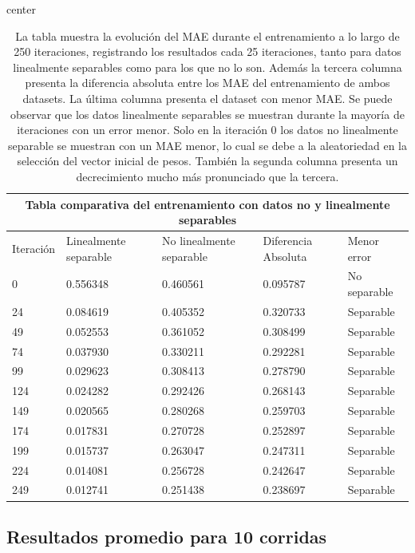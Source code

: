 \documentclass[12pt]{article}
\begin{document}
\begin{table}[H]
    \centering
    \begin{adjustbox}{center}
    \begin{tabular}{lllll}
    \multicolumn{5}{c}{Tabla comparativa del entrenamiento con datos no y linealmente separables} \\
    \toprule
     Iteración & Linealmente separable & No linealmente separable & Diferencia Absoluta & Menor error \\
    \midrule
    0 & 0.556348 & 0.460561 & 0.095787 & No separable \\
    24 & 0.084619 & 0.405352 & 0.320733 & Separable \\
    49 & 0.052553 & 0.361052 & 0.308499 & Separable \\
    74 & 0.037930 & 0.330211 & 0.292281 & Separable \\
    99 & 0.029623 & 0.308413 & 0.278790 & Separable \\
    124 & 0.024282 & 0.292426 & 0.268143 & Separable \\
    149 & 0.020565 & 0.280268 & 0.259703 & Separable \\
    174 & 0.017831 & 0.270728 & 0.252897 & Separable \\
    199 & 0.015737 & 0.263047 & 0.247311 & Separable \\
    224 & 0.014081 & 0.256728 & 0.242647 & Separable \\
    249 & 0.012741 & 0.251438 & 0.238697 & Separable \\
    \bottomrule
    \end{tabular}
    \end{adjustbox}
    \caption{La tabla muestra la evolución del MAE durante el entrenamiento a lo largo de 250 iteraciones, registrando los resultados cada 25 iteraciones, tanto para datos linealmente separables como para los que no lo son. Además la tercera columna presenta la diferencia absoluta entre los MAE del entrenamiento de ambos datasets. La última columna presenta el dataset con menor MAE. Se puede observar que los datos linealmente separables se muestran durante la mayoría de iteraciones con un error menor. Solo en la iteración 0 los datos no linealmente separable se muestran con un MAE menor, lo cual se debe a la aleatoriedad en la selección del vector inicial de pesos. También la segunda columna presenta un decrecimiento mucho más pronunciado que la tercera.}
\end{table}

\subsection{Resultados promedio para 10 corridas}
\end{document}
